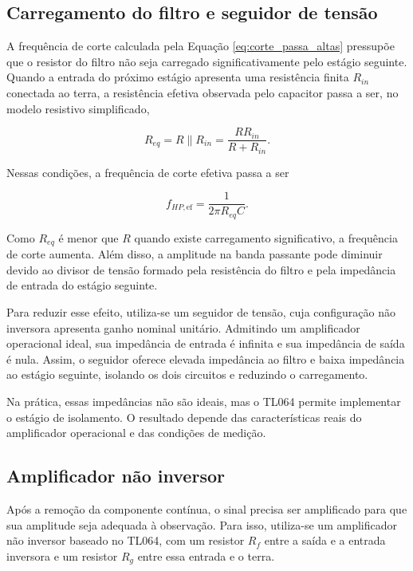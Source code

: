 \documentclass[11pt,a4paper]{article}
\begin{document}
\subsection{Carregamento do filtro e seguidor de tensão}

A frequência de corte calculada pela Equação \ref{eq:corte_passa_altas} pressupõe que o resistor do filtro não seja carregado significativamente pelo estágio seguinte. Quando a entrada do próximo estágio apresenta uma resistência finita $R_{in}$ conectada ao terra, a resistência efetiva observada pelo capacitor passa a ser, no modelo resistivo simplificado,

\begin{equation}
R_{eq}=R\parallel R_{in}
=\frac{RR_{in}}{R+R_{in}}.
\label{eq:resistencia_equivalente_hp}
\end{equation}

Nessas condições, a frequência de corte efetiva passa a ser

\begin{equation}
f_{HP,\mathrm{ef}}
=
\frac{1}{2\pi R_{eq}C}.
\label{eq:corte_efetivo_hp}
\end{equation}

Como $R_{eq}$ é menor que $R$ quando existe carregamento significativo, a frequência de corte aumenta. Além disso, a amplitude na banda passante pode diminuir devido ao divisor de tensão formado pela resistência do filtro e pela impedância de entrada do estágio seguinte.

Para reduzir esse efeito, utiliza-se um seguidor de tensão, cuja configuração não inversora apresenta ganho nominal unitário. Admitindo um amplificador operacional ideal, sua impedância de entrada é infinita e sua impedância de saída é nula. Assim, o seguidor oferece elevada impedância ao filtro e baixa impedância ao estágio seguinte, isolando os dois circuitos e reduzindo o carregamento.

Na prática, essas impedâncias não são ideais, mas o TL064 permite implementar o estágio de isolamento. O resultado depende das características reais do amplificador operacional e das condições de medição.

\subsection{Amplificador não inversor}

Após a remoção da componente contínua, o sinal precisa ser amplificado para que sua amplitude seja adequada à observação. Para isso, utiliza-se um amplificador não inversor baseado no TL064, com um resistor $R_f$ entre a saída e a entrada inversora e um resistor $R_g$ entre essa entrada e o terra.
\end{document}
